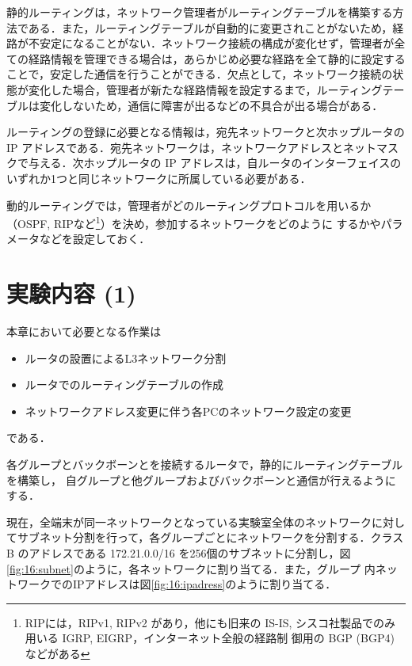 静的ルーティングは，ネットワーク管理者がルーティングテーブルを構築する方
法である．また，ルーティングテーブルが自動的に変更されことがないため，経
路が不安定になることがない．ネットワーク接続の構成が変化せず，管理者が全
ての経路情報を管理できる場合は，あらかじめ必要な経路を全て静的に設定する
ことで，安定した通信を行うことができる．欠点として，ネットワーク接続の状
態が変化した場合，管理者が新たな経路情報を設定するまで，ルーティングテー
ブルは変化しないため，通信に障害が出るなどの不具合が出る場合がある．

ルーティングの登録に必要となる情報は，宛先ネットワークと次ホップルータの 
IP アドレスである．宛先ネットワークは，ネットワークアドレスとネットマス
クで与える．次ホップルータの IP アドレスは，自ルータのインターフェイスの
いずれか1つと同じネットワークに所属している必要がある．

動的ルーティングでは，管理者がどのルーティングプロトコルを用いるか
（OSPF, RIPなど\footnote{RIPには，RIPv1, RIPv2 があり，他にも旧来の
IS-IS, シスコ社製品でのみ用いる IGRP, EIGRP，インターネット全般の経路制
御用の BGP (BGP4) などがある}）を決め，参加するネットワークをどのように
するかやパラメータなどを設定しておく．

\section{実験内容 (1)}
本章において必要となる作業は
\begin{itemize}
\item ルータの設置によるL3ネットワーク分割
\item ルータでのルーティングテーブルの作成
\item ネットワークアドレス変更に伴う各PCのネットワーク設定の変更
\end{itemize}
である．

各グループとバックボーンとを接続するルータで，静的にルーティングテーブルを構築し，
自グループと他グループおよびバックボーンと通信が行えるようにする．

現在，全端末が同一ネットワークとなっている実験室全体のネットワークに対し
てサブネット分割を行って，各グループごとにネットワークを分割する．クラス
B のアドレスである 172.21.0.0/16 を256個のサブネットに分割し，図
\ref{fig:16:subnet}のように，各ネットワークに割り当てる．また，グループ
内ネットワークでのIPアドレスは図\ref{fig:16:ipadress}のように割り当てる．

